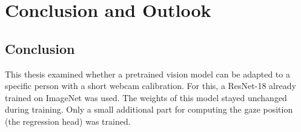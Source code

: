 \chapter{Conclusion and Outlook}
\label{ch:fazit}

\section{Conclusion}
\label{sec:fazit}
This thesis examined whether a pretrained vision model can be adapted to a
specific person with a short webcam calibration. For this, a ResNet-18 already
trained on ImageNet was used. The weights of this model stayed unchanged during
training. Only a small additional part for computing the gaze position (the
regression head) was trained.

